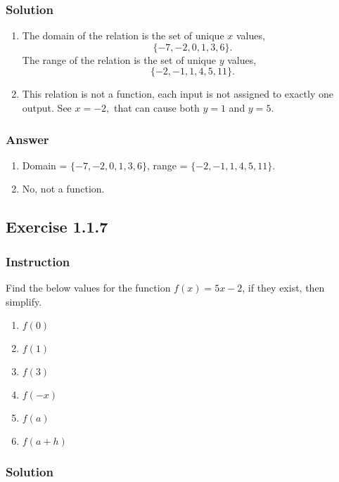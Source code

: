 \documentclass[11pt, letterpaper, oneside]{memoir}
\begin{document}
\subsubsection{Solution}

\begin{enumerate}[label=(\alph*)]
  \item The domain of the relation is the set of unique $ x $ values,
    $$ \phantom{.}
    \{ -7, -2, 0, 1, 3, 6 \}
    .$$
    The range of the relation is the set of unique $ y $ values,
    $$ \phantom{.}
    \{ -2, -1, 1, 4, 5, 11\}
    .$$
  \item This relation is not a function, each input is not assigned to exactly one output. See $ x = -2, $ that can cause both $ y = 1 $ and $ y = 5 $.
\end{enumerate}

\subsubsection{Answer}

\begin{enumerate}[label=(\alph*)]
  \item Domain = $  \{ -7, -2, 0, 1, 3, 6 \} $, range = $ \{ -2, -1, 1, 4, 5, 11\} $.
  \item No, not a function.
\end{enumerate}

\subsection*{Exercise 1.1.7}

\subsubsection{Instruction}

Find the below values for the function $ f(x) = 5x - 2 $, if they exist, then simplify.
\begin{enumerate}[label=(\alph*)]
  \item $ f(0) $
  \item $ f(1) $
  \item $ f(3) $
  \item $ f(-x) $
  \item $ f(a) $
  \item $ f(a + h) $
\end{enumerate}

\subsubsection{Solution}
\end{document}

